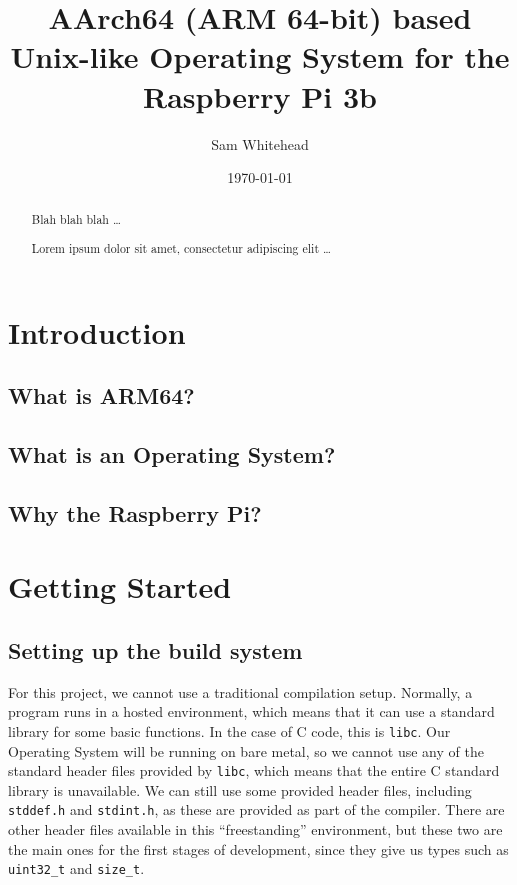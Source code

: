 \documentclass{article}
\title{AArch64 (ARM 64-bit) based Unix-like Operating System for the Raspberry
Pi 3b}
\author{Sam Whitehead}
\date{\mydate\today}
\begin{document}
\begin{titlingpage}
    \maketitle
    \begin{abstract}
        \setlength{\parindent}{0pt}
        \setlength{\parskip}{0.5em}
        \noindent
        Blah blah blah \dots

        Lorem ipsum dolor sit amet, consectetur adipiscing elit \dots
    \end{abstract}
\end{titlingpage}
\tableofcontents

\clearpage
\section{Introduction}
\subsection{What is ARM64?}
\subsection{What is an Operating System?}
\subsection{Why the Raspberry Pi?}

\clearpage
\section{Getting Started}
\subsection{Setting up the build system}
For this project, we cannot use a traditional compilation setup. Normally, a
program runs in a hosted environment, which means that it can use a standard
library for some basic functions. In the case of C code, this is \texttt{libc}.
Our Operating System will be running on bare metal, so we cannot use any of the
standard header files provided by \texttt{libc}, which means that the entire C
standard library is unavailable. We can still use some provided header files,
including \texttt{stddef.h} and \texttt{stdint.h}, as these are provided as
part of the compiler. There are other header files available in this
``freestanding'' environment, but these two are the main ones for the first
stages of development, since they give us types such as \texttt{uint32\_t} and
\texttt{size\_t}.
\end{document}
